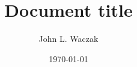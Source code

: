 \documentclass[12pt]{article}
\begin{document}
\title{Document title} 
\date{\today}
\author{John L. Waczak}
\maketitle

\doublespacing
\end{document}
